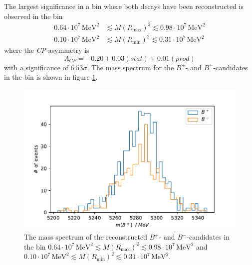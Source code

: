 The largest significance in a bin where both decays have been reconstructed is observed in the bin 
\begin{align*}
  0.64 \cdot 10^{7} \, \si{\mega\eV\squared} &\lesssim M(R_\text{max})^2 \lesssim 0.98\cdot 10^{7} \, \si{\mega\eV\squared} \\
  0.10 \cdot 10^{7} \, \si{\mega\eV\squared} &\lesssim M(R_\text{min})^2 \lesssim 0.31 \cdot 10^{7} \, \si{\mega\eV\squared}
\end{align*}
where the \textit{CP}-asymmetry is 
\begin{equation}
  A_\textit{CP} = -0.20 \pm 0.03(stat)  \pm 0.01(prod)
\end{equation}
with a significance of $6.53 \sigma$. The mass spectrum for the $B^+$- and $B^-$-candidates in the bin is shown in figure \ref{f8}.

\begin{figure}[H]
  \centering
    \includegraphics[width=\textwidth]{plots/num_b.pdf}
  \caption{The mass spectrum of the reconstructed $B^+$- and $B^-$-candidates in the bin 
  $0.64 \cdot 10^{7} \, \si{\mega\eV\squared} \lesssim M(R_\text{max})^2 \lesssim 0.98\cdot 10^{7} \, \si{\mega\eV\squared}$ and 
  $0.10 \cdot 10^{7} \, \si{\mega\eV\squared} \lesssim M(R_\text{min})^2 \lesssim 0.31 \cdot 10^{7} \, \si{\mega\eV\squared}$.}
  \label{f8}
\end{figure}


